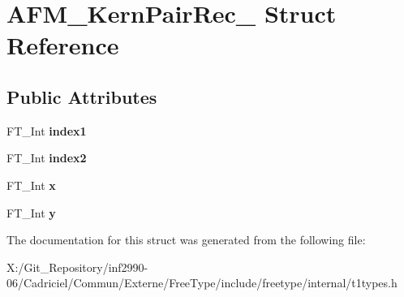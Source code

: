\hypertarget{struct_a_f_m___kern_pair_rec__}{\section{A\-F\-M\-\_\-\-Kern\-Pair\-Rec\-\_\- Struct Reference}
\label{struct_a_f_m___kern_pair_rec__}
}
\subsection*{Public Attributes}
\begin{DoxyCompactItemize}
\item 
\hypertarget{struct_a_f_m___kern_pair_rec___a732bca56dd4a070b1d887ada1637e810}{F\-T\-\_\-\-Int {\bfseries index1}}\label{struct_a_f_m___kern_pair_rec___a732bca56dd4a070b1d887ada1637e810}

\item 
\hypertarget{struct_a_f_m___kern_pair_rec___aee548123779323c255180112c7f5b831}{F\-T\-\_\-\-Int {\bfseries index2}}\label{struct_a_f_m___kern_pair_rec___aee548123779323c255180112c7f5b831}

\item 
\hypertarget{struct_a_f_m___kern_pair_rec___a4b7f90a0e17ed89353fec14ddb29fa12}{F\-T\-\_\-\-Int {\bfseries x}}\label{struct_a_f_m___kern_pair_rec___a4b7f90a0e17ed89353fec14ddb29fa12}

\item 
\hypertarget{struct_a_f_m___kern_pair_rec___aa177aa612e79701261eba72c76ea3f08}{F\-T\-\_\-\-Int {\bfseries y}}\label{struct_a_f_m___kern_pair_rec___aa177aa612e79701261eba72c76ea3f08}

\end{DoxyCompactItemize}


The documentation for this struct was generated from the following file\-:\begin{DoxyCompactItemize}
\item 
X\-:/\-Git\-\_\-\-Repository/inf2990-\/06/\-Cadriciel/\-Commun/\-Externe/\-Free\-Type/include/freetype/internal/t1types.\-h\end{DoxyCompactItemize}
